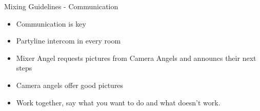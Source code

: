\documentclass[aspectratio=169]{beamer}
\begin{document}
\begin{frame}{Mixing Guidelines - Communication}
	\begin{itemize}
		\item Communication is key
		\item Partyline intercom in every room
		\item Mixer Angel requests pictures from Camera Angels and announcs their next steps
		\item Camera angels offer good pictures
		\item Work together, say what you want to do and what doesn't work.
	\end{itemize}
\end{frame}

%
\end{document}
